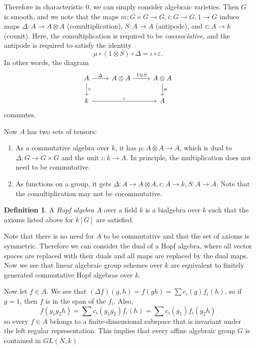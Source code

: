 \documentclass[leqno, openany]{memoir}
\theoremstyle{definition}
\newtheorem{defn}[thm]{Definition}
\theoremstyle{remark}
\theoremstyle{plain}
\theoremstyle{definition}
\theoremstyle{remark}
\newcommand{\ep}{\varepsilon}
\begin{document}
Therefore in characteristic $0$, we can simply consider algebraic varieties. Then $G$ is smooth, and we note that the maps $m \colon G \times G \to G, i \colon G \to G, 1 \to G$ induce maps $\Delta \colon A \to A \otimes A$ (comultiplication), $S \colon A \to A$ (antipode), and $\ep \colon A \to k$ (counit). Here, the comultiplication is required to be \textit{coassociative}, and the antipode is required to satisfy the identity
\[ \mu \circ (1 \otimes S) \circ \Delta = \iota \circ \ep. \]
In other words, the diagram
\begin{equation*}
\begin{tikzcd}
    A \arrow{r}{\Delta} \arrow{d}{\ep} & A \otimes A \arrow{r}{1 \otimes S} & A \otimes A \arrow{d}{\mu} \\
    k \arrow{rr}{\iota} & & A
\end{tikzcd}
\end{equation*}
commutes.

Now $A$ has two sets of tensors:
\begin{enumerate}
    \item As a commutative algebra over $k$, it has $\mu \colon A \otimes A \to A$, which is dual to $\Delta \colon G \to G \times G$ and the unit $\iota \colon k \to A$. In principle, the multiplication does not need to be commutative.
    \item As functions on a group, it gets $\Delta \colon A \to A \otimes A, \ep \colon A \to k, S \colon A \to A$. Note that the comultiplication may not be cocommutative.
\end{enumerate}

\begin{defn}
    A \textit{Hopf algebra} $A$ over a field $k$ is a bialgebra over $k$ such that the axioms listed above for $k[G]$ are satisfied. 
\end{defn}

Note that there is no need for $A$ to be commutative and that the set of axioms is symmetric. Therefore we can consider the dual of a Hopf algebra, where all vector spaces are replaced with their duals and all maps are replaced by the dual maps. Now we see that linear algebraic group schemes over $k$ are equivalent to finitely generated commutative Hopf algebras over $k$.

Now let $f \in A$. We see that $(\Delta f)(g,h) = f(gh) = \sum c_i(g) f_i(h)$, so if $g = 1$, then $f$ is in the span of the $f_i$. Also, 
\[ f(g_1g_2h) = \sum c_i (g_1g_2)f_i(h) = \sum c_i(g_1) f_i(g_2 h) \]
so every $f \in A$ belongs to a finite-dimensional subspace that is invariant under the left regular representation. This implies that every affine algebraic group $G$ is contained in $GL(N, k)$
\end{document}
